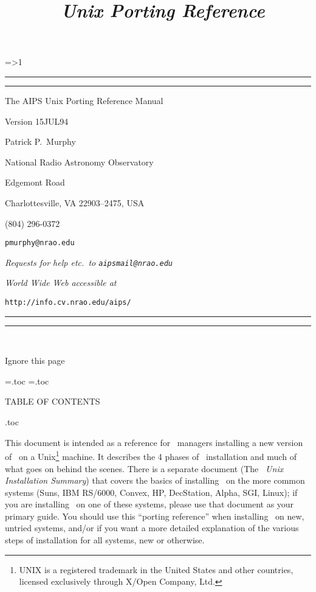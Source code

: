 \title{\aips\ \it Unix Porting Reference}
\footline={\ifnum\pageno>1
                \ifodd{}
                \fi
           \else
                \hfil
           \fi}
\hrule height1.5pt \vskip 2pt \hrule \vskip 4cm
\def\thisver{15JUL94}
\centerline{\nraofont The AIPS Unix Porting Reference Manual}
\bigskip
\centerline{\twelvesl Version \thisver}
\bigskip\bigskip
\centerline{\twelveit Patrick P.~Murphy}
\centerline{\twelveit National Radio Astronomy Observatory}
\centerline{ Edgemont Road}
\centerline{\twelveit Charlottesville, VA 22903--2475, USA}
\centerline{\twelveit (804) 296-0372}
\smallskip
\centerline{\tt pmurphy@nrao.edu}
\medskip
\centerline{\it Requests for help etc.~to \/ \tt aipsmail@nrao.edu}
\medskip
\centerline{\sl World Wide Web accessible at}
\centerline{\tt http://info.cv.nrao.edu/aips/}
\bigskip

\vfill
\hrule \vskip 2pt \hrule height 1.5pt
\eject
\ \vskip 5cm
\centerline{Ignore this page}
\vfill\eject
{}
\newread\testfile
\newwrite\contfile
\openin\testfile=\jobname.toc
 \ifeof\testfile{}
  \closein\testfile
  \immediate\openout\contfile=\jobname.toc
 \else
  \closein\testfile
  \ \bigskip\centerline{\nraofont TABLE OF CONTENTS}\bigskip
  \jobname.toc
\fi
\vfill\eject

This document is intended as a reference for \AIPS\ managers installing a
new version of \AIPS\ on a Unix\footnote*{\eightpoint UNIX is a registered
                                          trademark in the United States
                                          and other countries, licensed
                                          exclusively through X/Open
                                          Company, Ltd.}
machine.  It describes the 4 phases of \AIPS\ installation and much of
what goes on behind the scenes.  There is a separate document (The {\it
\AIPS\ Unix Installation Summary\/}) that covers the basics of installing
\AIPS\ on the more common systems (Suns, IBM RS/6000, Convex, HP,
DecStation, Alpha, SGI, Linux); if you are installing \AIPS\ on one of
these systems, please use that document as your primary guide.  You should
use this ``porting reference'' when installing \AIPS\ on new, untried
systems, and/or if you want a more detailed explanation of the various
steps of installation for all systems, new or otherwise.

